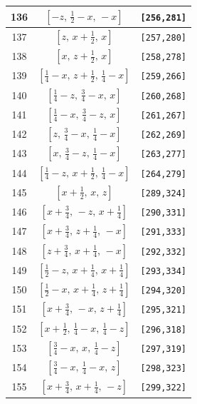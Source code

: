 \documentclass[fleqn,8pt]{jsarticle}
\begin{document}
\begin{longtable}{ccc}
136 & $\left[ - z,\, \frac{1}{2} - x,\, - x \right]$ & {\tt [256,281]} \\ \hline
137 & $\left[ z,\, x + \frac{1}{2},\, x \right]$ & {\tt [257,280]} \\ \hline
138 & $\left[ x,\, z + \frac{1}{2},\, x \right]$ & {\tt [258,278]} \\ \hline
139 & $\left[ \frac{1}{4} - x,\, z + \frac{1}{2},\, \frac{1}{4} - x \right]$ & {\tt [259,266]} \\ \hline
140 & $\left[ \frac{1}{4} - z,\, \frac{3}{4} - x,\, x \right]$ & {\tt [260,268]} \\ \hline
141 & $\left[ \frac{1}{4} - x,\, \frac{3}{4} - z,\, x \right]$ & {\tt [261,267]} \\ \hline
142 & $\left[ z,\, \frac{3}{4} - x,\, \frac{1}{4} - x \right]$ & {\tt [262,269]} \\ \hline
143 & $\left[ x,\, \frac{3}{4} - z,\, \frac{1}{4} - x \right]$ & {\tt [263,277]} \\ \hline
144 & $\left[ \frac{1}{4} - z,\, x + \frac{1}{2},\, \frac{1}{4} - x \right]$ & {\tt [264,279]} \\ \hline
145 & $\left[ x + \frac{1}{2},\, x,\, z \right]$ & {\tt [289,324]} \\ \hline
146 & $\left[ x + \frac{3}{4},\, - z,\, x + \frac{1}{4} \right]$ & {\tt [290,331]} \\ \hline
147 & $\left[ x + \frac{3}{4},\, z + \frac{1}{4},\, - x \right]$ & {\tt [291,333]} \\ \hline
148 & $\left[ z + \frac{3}{4},\, x + \frac{1}{4},\, - x \right]$ & {\tt [292,332]} \\ \hline
149 & $\left[ \frac{1}{2} - z,\, x + \frac{1}{4},\, x + \frac{1}{4} \right]$ & {\tt [293,334]} \\ \hline
150 & $\left[ \frac{1}{2} - x,\, x + \frac{1}{4},\, z + \frac{1}{4} \right]$ & {\tt [294,320]} \\ \hline
151 & $\left[ x + \frac{3}{4},\, - x,\, z + \frac{1}{4} \right]$ & {\tt [295,321]} \\ \hline
152 & $\left[ x + \frac{1}{2},\, \frac{1}{4} - x,\, \frac{1}{4} - z \right]$ & {\tt [296,318]} \\ \hline
153 & $\left[ \frac{3}{4} - x,\, x,\, \frac{1}{4} - z \right]$ & {\tt [297,319]} \\ \hline
154 & $\left[ \frac{3}{4} - x,\, \frac{1}{4} - x,\, z \right]$ & {\tt [298,323]} \\ \hline
155 & $\left[ x + \frac{3}{4},\, x + \frac{1}{4},\, - z \right]$ & {\tt [299,322]} \\ \hline

\end{longtable}
\end{document}
